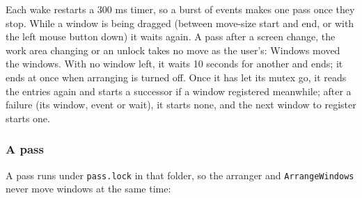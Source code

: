 \documentclass[10pt,a4paper]{article}
\newcommand{\code}[1]{\texttt{#1}}
\begin{document}
Each wake restarts a 300 ms timer, so a burst of events makes one pass once they stop. While a
window is being dragged (between move-size start and end, or with the left mouse button down) it
waits again. A pass after a screen change, the work area changing or an unlock takes no move as
the user's: Windows moved the windows. With no window left, it waits 10 seconds for another and
ends; it ends at once when arranging is turned off. Once it has let its mutex go, it reads the
entries again and starts a successor if a window registered meanwhile; after a failure (its window,
event or wait), it starts none, and the next window to register starts one.

\subsubsection*{A pass}

A pass runs under \code{pass.lock} in that folder, so the arranger and \code{ArrangeWindows} never move
windows at the same time:
\end{document}
